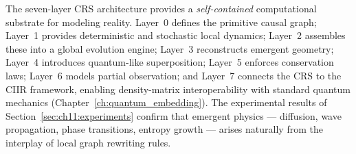 \begin{remark}
\label{rem:11.3}
The seven-layer CRS architecture provides a \emph{self-contained}
computational substrate for modeling reality.  Layer~0 defines the
primitive causal graph; Layer~1 provides deterministic and stochastic
local dynamics; Layer~2 assembles these into a global evolution engine;
Layer~3 reconstructs emergent geometry; Layer~4 introduces quantum-like
superposition; Layer~5 enforces conservation laws; Layer~6 models
partial observation; and Layer~7 connects the CRS to the CIIR
framework, enabling density-matrix interoperability with standard
quantum mechanics (Chapter~\ref{ch:quantum_embedding}).  The
experimental results of Section~\ref{sec:ch11:experiments} confirm
that emergent physics --- diffusion, wave propagation, phase
transitions, entropy growth --- arises naturally from the interplay
of local graph rewriting rules.
\end{remark}

